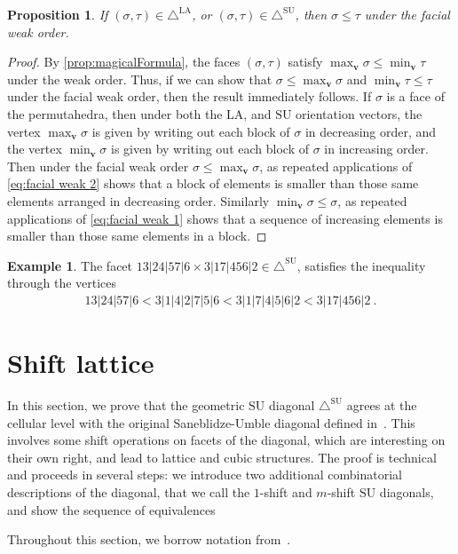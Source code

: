 \documentclass{amsart}
\newtheorem{proposition}[theorem]{Proposition}
\theoremstyle{definition}
\newtheorem{example}[theorem]{Example}
\newcommand{\SU}{\mathrm{SU}}
\newcommand{\LA}{\mathrm{LA}}
\newcommand{\SUD}{\triangle^{\mathrm{SU}}}
\newcommand{\LAD}{\triangle^{\mathrm{LA}}}
\begin{document}
\begin{proposition}
If $(\sigma,\tau)\in \LAD$, or $(\sigma,\tau)\in \SUD$, then $\sigma \leq \tau$ under the facial weak order.
\end{proposition}

\begin{proof}
By \cref{prop:magicalFormula}, the faces $(\sigma,\tau)$ satisfy $\max_{\mathbf{v}} \sigma \leq \min_{\mathbf{v}} \tau$ under the weak order.
Thus, if we can show that $\sigma\leq \max_{\mathbf{v}} \sigma$ and $\min_{\mathbf{v}} \tau \leq \tau$ under the facial weak order, then the result immediately follows.
If $\sigma$ is a face of the permutahedra, then under both the $\LA$, and $\SU$ orientation vectors, the vertex $\max_{\mathbf{v}} \sigma$ is given by writing out each block of $\sigma$ in decreasing order, and the vertex $\min_{\mathbf{v}} \sigma$ is given by writing out each  block of $\sigma$ in increasing order.
Then under the facial weak order
$\sigma \leq \max_{\mathbf{v}} \sigma$, as repeated applications of \cref{eq:facial weak 2} shows that a block of elements is smaller than those same elements arranged in decreasing order.
Similarly $\min_{\mathbf{v}} \sigma \leq \sigma$, as repeated applications of \cref{eq:facial weak 1} shows that a sequence of increasing elements is smaller than those same elements in a block. 
\end{proof}

\begin{example}
The facet $13|24|57|6 \times 3|17|456|2 \in \SUD$, satisfies the inequality through the vertices
\begin{align*}
    13|24|57|6 <  3|1|4|2|7|5|6 <  3|1|7|4|5|6|2 <  3|17|456|2 \ .
\end{align*}
\end{example}


\newpage
\section{Shift lattice}
\label{sec:shifts}

In this section, we prove that the geometric $\SU$ diagonal $\SUD$ agrees at the cellular level with the original Saneblidze-Umble diagonal defined in~\cite{SaneblidzeUmble}.
This involves some shift operations on facets of the diagonal, which are interesting on their own right, and lead to lattice and cubic structures.
The proof is technical and proceeds in several steps: we introduce two additional combinatorial descriptions of the diagonal, that we call the $1$-shift and $m$-shift $\SU$ diagonals, and show the sequence of equivalences
\begin{center}
\end{center}
Throughout this section, we borrow notation from~\cite{SaneblidzeUmble-comparingDiagonals}.
\end{document}
